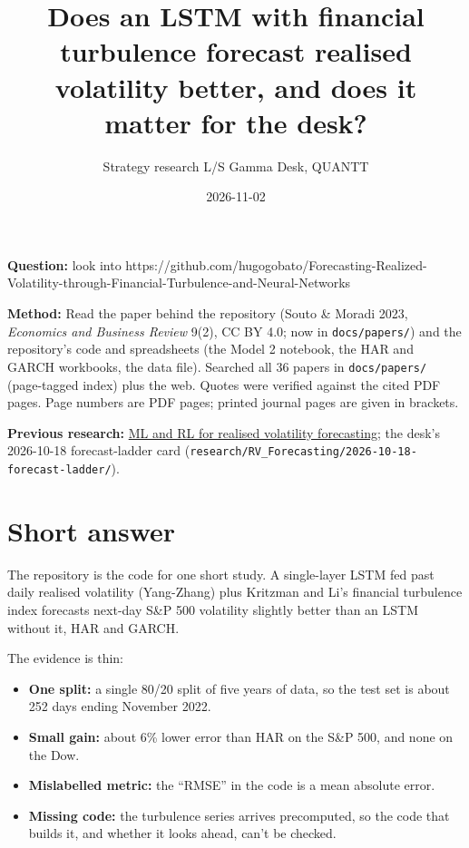 \documentclass{article}
\title{Does an LSTM with financial turbulence forecast realised volatility better, and does it matter for the desk?}
\author{Strategy research \textperiodcentered{} L/S Gamma Desk, QUANTT}
\date{2026-11-02}
\begin{document}
\maketitle

\textbf{Question:} look into https:/\allowbreak{}/\allowbreak{}github.com/\allowbreak{}hugogobato/\allowbreak{}Forecasting-Realized-Volatility-through-Financial-Turbulence-and-Neural-Networks

\textbf{Method:} Read the paper behind the repository (Souto \& Moradi 2023, \emph{Economics and Business Review} 9(2), CC BY 4.0; now in \texttt{docs/\allowbreak{}papers/\allowbreak{}}) and the repository's code and spreadsheets (the Model 2 notebook, the HAR and GARCH workbooks, the data file). Searched all 36 papers in \texttt{docs/\allowbreak{}papers/\allowbreak{}} (page-tagged index) plus the web. Quotes were verified against the cited PDF pages. Page numbers are PDF pages; printed journal pages are given in brackets.

\textbf{Previous research:} \href{2026-09-27-ml-rl-for-realised-volatility-forecasting.pdf}{ML and RL for realised volatility forecasting}; the desk's 2026-10-18 forecast-ladder card (\texttt{research/\allowbreak{}RV\_\allowbreak{}Forecasting/\allowbreak{}2026-\allowbreak{}10-\allowbreak{}18-\allowbreak{}forecast-\allowbreak{}ladder/\allowbreak{}}).

\section{Short answer}

The repository is the code for one short study. A single-layer LSTM fed past daily realised volatility (Yang-Zhang) plus Kritzman and Li's financial turbulence index forecasts next-day S\&P 500 volatility slightly better than an LSTM without it, HAR and GARCH.

The evidence is thin:

\begin{itemize}

\item \textbf{One split:} a single 80/\allowbreak{}20 split of five years of data, so the test set is about 252 days ending November 2022.

\item \textbf{Small gain:} about 6\% lower error than HAR on the S\&P 500, and none on the Dow.

\item \textbf{Mislabelled metric:} the ``RMSE'' in the code is a mean absolute error.

\item \textbf{Missing code:} the turbulence series arrives precomputed, so the code that builds it, and whether it looks ahead, can't be checked.

\end{itemize}
\end{document}
